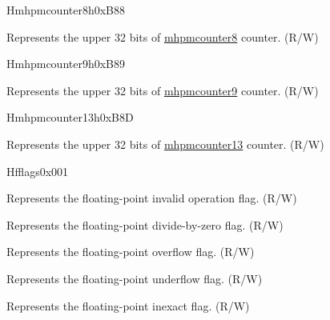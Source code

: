 \begin{register}{H}{mhpmcounter8h}{0xB88}\label{regdesc:MHPMCOUNTER8H}
%
\regnewline%
\begin{regdesc}\begin{reglist}
\label{fielddesc:MHPMCOUNTER8H}\item [MHPMCOUNTER8H] Represents the upper 32 bits of \hyperref[regdesc:MHPMCOUNTER8]{mhpmcounter8} counter. (R/W)
\end{reglist}\end{regdesc}
\end{register}

\begin{register}{H}{mhpmcounter9h}{0xB89}\label{regdesc:MHPMCOUNTER9H}
%
\regnewline%
\begin{regdesc}\begin{reglist}
\label{fielddesc:MHPMCOUNTER9H}\item [MHPMCOUNTER9H] Represents the upper 32 bits of \hyperref[regdesc:MHPMCOUNTER9]{mhpmcounter9} counter. (R/W)
\end{reglist}\end{regdesc}
\end{register}

\begin{register}{H}{mhpmcounter13h}{0xB8D}\label{regdesc:MHPMCOUNTER13H}
%
\regnewline%
\begin{regdesc}\begin{reglist}
\label{fielddesc:MHPMCOUNTER13H}\item [MHPMCOUNTER13H] Represents the upper 32 bits of \hyperref[regdesc:MHPMCOUNTER13]{mhpmcounter13} counter. (R/W)
\end{reglist}\end{regdesc}
\end{register}


\begin{register}{H}{fflags}{0x001}\label{regdesc:FFLAGS}
%
%
%
%
%
%
\regnewline%
\begin{regdesc}\begin{reglist}
\label{fielddesc:FFLAGS_NV}\item [NV] Represents the floating-point invalid operation flag. (R/W)
\label{fielddesc:FFLAGS_DZ}\item [DZ] Represents the floating-point divide-by-zero flag. (R/W)
\label{fielddesc:FFLAGS_OF}\item [OF] Represents the floating-point overflow flag. (R/W)
\label{fielddesc:FFLAGS_UF}\item [UF] Represents the floating-point underflow flag. (R/W)
\label{fielddesc:FFLAGS_NX}\item [NX] Represents the floating-point inexact flag. (R/W)
\end{reglist}\end{regdesc}
\end{register}

